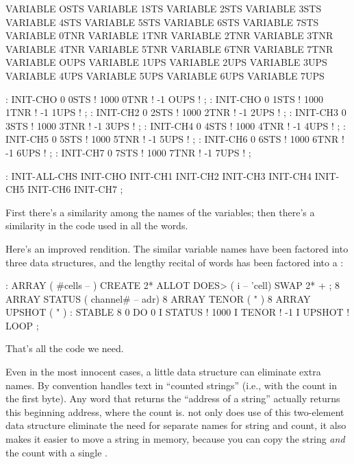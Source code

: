\begin{Code}
VARIABLE OSTS       VARIABLE 1STS       VARIABLE 2STS 
VARIABLE 3STS       VARIABLE 4STS       VARIABLE 5STS
VARIABLE 6STS       VARIABLE 7STS       VARIABLE 0TNR
VARIABLE 1TNR       VARIABLE 2TNR       VARIABLE 3TNR
VARIABLE 4TNR       VARIABLE 5TNR       VARIABLE 6TNR
VARIABLE 7TNR       VARIABLE OUPS       VARIABLE 1UPS
VARIABLE 2UPS       VARIABLE 3UPS       VARIABLE 4UPS
VARIABLE 5UPS       VARIABLE 6UPS       VARIABLE 7UPS
\end{Code}

\begin{Code} 
: INIT-CHO   0 0STS !  1000 0TNR !  -1 OUPS ! ; 
: INIT-CHO   0 1STS !  1000 1TNR !  -1 1UPS ! ; 
: INIT-CH2   0 2STS !  1000 2TNR !  -1 2UPS ! ; 
: INIT-CH3   0 3STS !  1000 3TNR !  -1 3UPS ! ; 
: INIT-CH4   0 4STS !  1000 4TNR !  -1 4UPS ! ; 
: INIT-CH5   0 5STS !  1000 5TNR !  -1 5UPS ! ; 
: INIT-CH6   0 6STS !  1000 6TNR !  -1 6UPS ! ; 
: INIT-CH7   0 7STS !  1000 7TNR !  -1 7UPS ! ; 
\end{Code}

\begin{Code} 
: INIT-ALL-CHS    INIT-CHO  INIT-CH1  INIT-CH2  INIT-CH3
   INIT-CH4  INIT-CH5  INIT-CH6  INIT-CH7 ;
\end{Code}
First there's a similarity among the names of the variables; then
there's a similarity in the code used in all the 
words.

Here's an improved rendition. The similar variable names have been
factored into three data structures, and the lengthy recital of
 words has been factored into a :

\begin{Code}
: ARRAY  ( #cells -- )  CREATE  2* ALLOT
   DOES> ( i -- 'cell)  SWAP  2* + ; 
8 ARRAY STATUS  ( channel# -- adr)
8 ARRAY TENOR   (        "       )
8 ARRAY UPSHOT  (        "       )
: STABLE   8 0 DO  0 I STATUS !  1000 I TENOR ! 
   -1 I UPSHOT !  LOOP ;
\end{Code}
That's all the code we need.

Even in the most innocent cases, a little data structure can eliminate
extra names. By convention \Forth{} handles text in ``counted
strings'' (i.e., with the count in the first byte). Any word that
returns the ``address of a string'' actually returns this beginning
address, where the count is. not only does use of this two-element
data structure eliminate the need for separate names for string and
count, it also makes it easier to move a string in memory, because you
can copy the string \emph{and} the count with a single .

